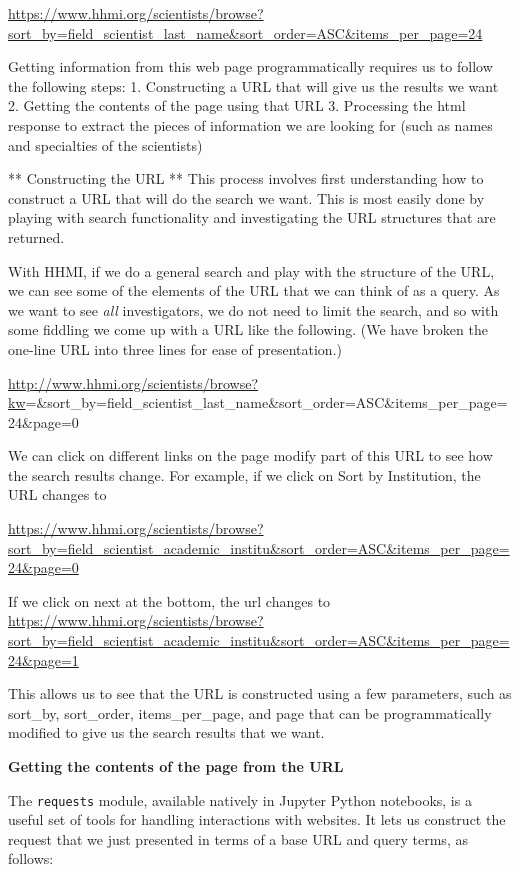 \documentclass[]{krantz}
\begin{document}
\url{https://www.hhmi.org/scientists/browse?sort_by=field_scientist_last_name\&sort_order=ASC\&items_per_page=24}

Getting information from this web page programmatically requires us to
follow the following steps: 1. Constructing a URL that will give us the
results we want 2. Getting the contents of the page using that URL 3.
Processing the html response to extract the pieces of information we are
looking for (such as names and specialties of the scientists)

** Constructing the URL ** This process involves first understanding how
to construct a URL that will do the search we want. This is most easily
done by playing with search functionality and investigating the URL
structures that are returned.

With HHMI, if we do a general search and play with the structure of the
URL, we can see some of the elements of the URL that we can think of as
a query. As we want to see \emph{all} investigators, we do not need to
limit the search, and so with some fiddling we come up with a URL like
the following. (We have broken the one-line URL into three lines for
ease of presentation.)

\url{http://www.hhmi.org/scientists/browse?kw}=\&sort\_by=field\_scientist\_last\_name\&sort\_order=ASC\&items\_per\_page=24\&page=0

We can click on different links on the page modify part of this URL to
see how the search results change. For example, if we click on Sort by
Institution, the URL changes to

\url{https://www.hhmi.org/scientists/browse?sort_by=field_scientist_academic_institu\&sort_order=ASC\&items_per_page=24\&page=0}

If we click on next at the bottom, the url changes to
\url{https://www.hhmi.org/scientists/browse?sort_by=field_scientist_academic_institu\&sort_order=ASC\&items_per_page=24\&page=1}

This allows us to see that the URL is constructed using a few
parameters, such as sort\_by, sort\_order, items\_per\_page, and page
that can be programmatically modified to give us the search results that
we want.

\textbf{Getting the contents of the page from the URL}

The \texttt{requests} module, available natively in Jupyter Python
notebooks, is a useful set of tools for handling interactions with
websites. It lets us construct the request that we just presented in
terms of a base URL and query terms, as follows:
\end{document}
